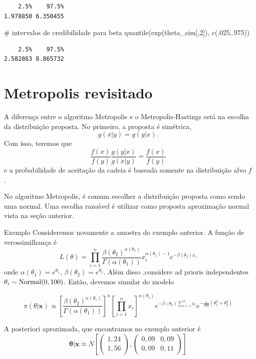 \documentclass[
  letterpaper,
  DIV=11,
  numbers=noendperiod]{scrreprt}
\newenvironment{Shaded}{\begin{snugshade}}{\end{snugshade}}
\newcommand{\CommentTok}[1]{\textcolor[rgb]{0.37,0.37,0.37}{#1}}
\newcommand{\DecValTok}[1]{\textcolor[rgb]{0.68,0.00,0.00}{#1}}
\newcommand{\FunctionTok}[1]{\textcolor[rgb]{0.28,0.35,0.67}{#1}}
\newcommand{\NormalTok}[1]{\textcolor[rgb]{0.00,0.23,0.31}{#1}}
\theoremstyle{plain}
\theoremstyle{definition}
\theoremstyle{definition}
\theoremstyle{remark}
\begin{document}
\begin{verbatim}
    2.5%    97.5% 
1.978850 6.350455 
\end{verbatim}

\begin{Shaded}
\begin{Highlighting}[]
\CommentTok{\# intervalos de credibilidade para beta}
\FunctionTok{quantile}\NormalTok{(}\FunctionTok{exp}\NormalTok{(theta\_sim[,}\DecValTok{2}\NormalTok{]), }\FunctionTok{c}\NormalTok{(.}\DecValTok{025}\NormalTok{,.}\DecValTok{975}\NormalTok{))}
\end{Highlighting}
\end{Shaded}

\begin{verbatim}
    2.5%    97.5% 
2.582863 8.865732 
\end{verbatim}

\section{Metropolis revisitado}\label{metropolis-revisitado}

A diferença entre o algoritmo Metropolis e o Metropolis-Hastings está na
escolha da distribuição proposta. No primeiro, a proposta é simétrica,
\[g(x|y)=g(y|x).\] Com isso, teremos que
\[\frac{f(x)}{f(y)}\frac{g(y|x)}{g(x|y)}=\frac{f(x)}{f(y)}\] e a
probabilidade de aceitação da cadeia é baseada somente na distribuição
alvo \(f\).

No algoritmo Metropolis, é comum escolher a distribuição proposta como
sendo uma normal. Uma escolha razoável é utilizar como proposta
aproximação normal vista na seção anterior.

Exemplo Consideremos novamente a amostra do exemplo anterior. A função
de verossimilhança é
\[L(\theta)=\prod_{i=1}^n \frac{\beta(\theta_2)^{\alpha(\theta_1)}}{\Gamma(\alpha(\theta_1))} x_i^{\alpha(\theta_1)-1}e^{-\beta(\theta_2)x_i}\]
onde \(\alpha(\theta_1)=e^{\theta_1}\),
\(\beta(\theta_2)=e^{\theta_2}\). Além disso ,considere ad prioris
independentes \(\theta_i\sim\hbox{Normal}(0,100)\). Então, devemos
simular do modelo

\[\pi(\theta|\boldsymbol{x})\propto \left[\frac{\beta(\theta_2)^{\alpha(\theta_1)}}{\Gamma(\alpha(\theta_1))}\right]^n \left[\prod_{i=1}^n x_i\right]^{\alpha(\theta_1)}e^{-\beta(\theta_2)\sum_{i=1}^{n}x_i}e^{-\frac{1}{200}(\theta_1^2 + \theta_2^2)}\]

A posteriori aproximada, que encontramos no exemplo anterior é
\[\boldsymbol{\theta}|\boldsymbol{x}\approx N \left[ \left(\begin{array}{c}1,24\\1,56 \end{array}\right),\left(\begin{array}{cc}0,09 & 0,09\\0,09 &0,11\end{array}\right)\right]\]
\end{document}

